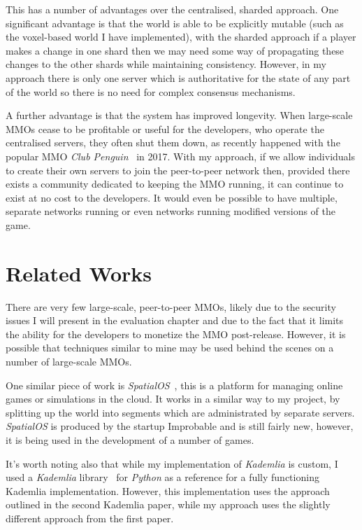 \documentclass[10pt,twoside,notitlepage,a4paper]{report}
\newcommand{\python}{\emph{Python}}
\newcommand{\kademlia}{\emph{Kademlia}}
\begin{document}
	This has a number of advantages over the centralised, sharded approach. One significant advantage is that the world is able to be explicitly mutable (such as the voxel-based world I have implemented), with the sharded approach if a player makes a change in one shard then we may need some way of propagating these changes to the other shards while maintaining consistency. However, in my approach there is only one server which is authoritative for the state of any part of the world so there is no need for complex consensus mechanisms.
	
	A further advantage is that the system has improved longevity. When large-scale MMOs cease to be profitable or useful for the developers, who operate the centralised servers, they often shut them down, as recently happened with the popular MMO \emph{Club Penguin}~\cite{clubpenguin} in 2017. With my approach, if we allow individuals to create their own servers to join the peer-to-peer network then, provided there exists a community dedicated to keeping the MMO running, it can continue to exist at no cost to the developers. It would even be possible to have multiple, separate networks running or even networks running modified versions of the game.
	
	\section{Related Works}
	There are very few large-scale, peer-to-peer MMOs, likely due to the security issues I will present in the evaluation chapter and due to the fact that it limits the ability for the developers to monetize the MMO post-release. However, it is possible that techniques similar to mine may be used behind the scenes on a number of large-scale MMOs.
	
	One similar piece of work is \emph{SpatialOS}~\cite{SpatialOS}, this is a platform for managing online games or simulations in the cloud. It works in a similar way to my project, by splitting up the world into segments which are administrated by separate servers. \emph{SpatialOS} is produced by the startup Improbable and is still fairly new, however, it is being used in the development of a number of games.
	
	It's worth noting also that while my implementation of \kademlia{} is custom, I used a \kademlia{} library~\cite{pykademlia} for \python{} as a reference for a fully functioning Kademlia implementation. However, this implementation uses the approach outlined in the second Kademlia paper, while my approach uses the slightly different approach from the first paper.
	
\end{document}
